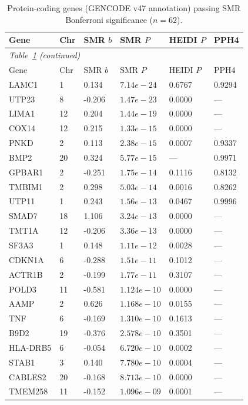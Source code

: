 \small
\begin{longtable}{llllll}
\caption{Protein-coding genes (GENCODE v47 annotation) passing SMR Bonferroni significance ($n=62$).}\label{tab:protein_coding}\\
\toprule
  Gene & Chr & SMR $b$ & SMR $P$ & HEIDI $P$ & PPH4 \\
\midrule
\endfirsthead
\multicolumn{6}{l}{\textit{Table~\ref{tab:protein_coding} (continued)}} \\
\toprule
  Gene & Chr & SMR $b$ & SMR $P$ & HEIDI $P$ & PPH4 \\
\midrule
\endhead
\bottomrule
\endfoot
  LAMC1 & 1 & 0.134 & $7.14e-24$ & 0.6767 & 0.9294 \\
  UTP23 & 8 & -0.206 & $1.47e-23$ & 0.0000 & --- \\
  LIMA1 & 12 & 0.204 & $1.44e-19$ & 0.0000 & --- \\
  COX14 & 12 & 0.215 & $1.33e-15$ & 0.0000 & --- \\
  PNKD & 2 & 0.113 & $2.38e-15$ & 0.0007 & 0.9337 \\
  BMP2 & 20 & 0.324 & $5.77e-15$ & --- & 0.9971 \\
  GPBAR1 & 2 & -0.251 & $1.75e-14$ & 0.1116 & 0.8132 \\
  TMBIM1 & 2 & 0.298 & $5.03e-14$ & 0.0016 & 0.8262 \\
  UTP11 & 1 & 0.243 & $1.56e-13$ & 0.0467 & 0.9996 \\
  SMAD7 & 18 & 1.106 & $3.24e-13$ & 0.0000 & --- \\
  TMT1A & 12 & -0.206 & $3.36e-13$ & 0.0000 & --- \\
  SF3A3 & 1 & 0.148 & $1.11e-12$ & 0.0028 & --- \\
  CDKN1A & 6 & -0.288 & $1.51e-11$ & 0.1012 & --- \\
  ACTR1B & 2 & -0.199 & $1.77e-11$ & 0.3107 & --- \\
  POLD3 & 11 & -0.581 & $1.124e-10$ & 0.0000 & --- \\
  AAMP & 2 & 0.626 & $1.168e-10$ & 0.0155 & --- \\
  TNF & 6 & -0.169 & $1.310e-10$ & 0.1613 & --- \\
  B9D2 & 19 & -0.376 & $2.578e-10$ & 0.3501 & --- \\
  HLA-DRB5 & 6 & -0.054 & $6.720e-10$ & 0.0002 & --- \\
  STAB1 & 3 & 0.140 & $7.780e-10$ & 0.0004 & --- \\
  CABLES2 & 20 & -0.168 & $8.713e-10$ & 0.0000 & --- \\
  TMEM258 & 11 & -0.152 & $1.096e-09$ & 0.0001 & --- \\

\end{longtable}
